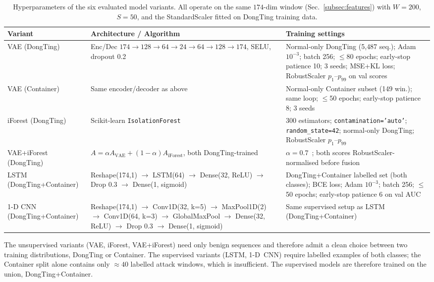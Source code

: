 \begin{table}[!t]
\centering
\caption{Hyperparameters of the six evaluated model variants. All
operate on the same $174$-dim window (Sec.~\ref{subsec:features}) with
$W=200$, $S=50$, and the StandardScaler fitted on DongTing training
data.}
\label{tab:v2_hyperparams}
\scriptsize
\setlength{\tabcolsep}{4pt}
\renewcommand{\arraystretch}{1.15}
\begin{tabularx}{\textwidth}{@{}p{3.4cm} X X@{}}
\toprule
\textbf{Variant} & \textbf{Architecture / Algorithm} & \textbf{Training settings} \\
\midrule
VAE (DongTing)
  & Enc/Dec $174{\rightarrow}128{\rightarrow}64{\rightarrow}24{\rightarrow}64{\rightarrow}128{\rightarrow}174$, SELU, dropout 0.2
  & Normal-only DongTing (5{,}487 seq.); Adam $10^{-3}$; batch 256; $\le$80 epochs; early-stop patience 10; 3 seeds; MSE+KL loss; RobustScaler $p_{1}$--$p_{99}$ on val scores \\
VAE (Container)
  & Same encoder/decoder as above
  & Normal-only Container subset (149 win.); same loop; $\le$50 epochs; early-stop patience 8; 3 seeds \\
iForest (DongTing)
  & Scikit-learn \texttt{IsolationForest}
  & 300 estimators; \texttt{contamination='auto'}; \texttt{random\_state=42}; normal-only DongTing; RobustScaler $p_{1}$--$p_{99}$ \\
VAE+iForest (DongTing)
  & $A = \alpha A_{\text{VAE}} + (1{-}\alpha) A_{\text{iForest}}$, both DongTing-trained
  & $\alpha = 0.7$~\cite{desfam2025}; both scores RobustScaler-normalised before fusion \\
LSTM (DongTing+Container)
  & Reshape(174,1) $\to$ LSTM(64) $\to$ Dense(32, ReLU) $\to$ Drop 0.3 $\to$ Dense(1, sigmoid)
  & DongTing+Container labelled set (both classes); BCE loss; Adam $10^{-3}$; batch 256; $\le$50 epochs; early-stop patience 6 on val AUC \\
1-D CNN (DongTing+Container)
  & Reshape(174,1) $\to$ Conv1D(32, k=5) $\to$ MaxPool1D(2) $\to$ Conv1D(64, k=3) $\to$ GlobalMaxPool $\to$ Dense(32, ReLU) $\to$ Drop 0.3 $\to$ Dense(1, sigmoid)
  & Same supervised setup as LSTM (DongTing+Container) \\
\bottomrule
\end{tabularx}
\end{table}

The unsupervised variants (VAE, iForest, VAE+iForest) need only
benign sequences and therefore admit a clean choice between two
training distributions, DongTing or Container. The supervised
variants (LSTM, 1-D~CNN) require labelled examples of both classes;
the Container split alone contains only $\approx\!40$ labelled attack
windows, which is insufficient. The supervised models are therefore
trained on the union, DongTing+Container.

